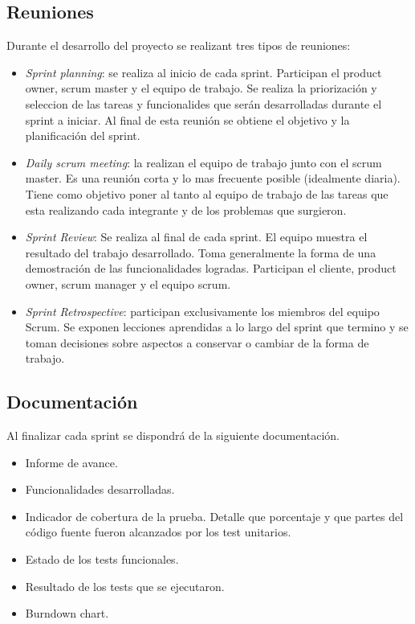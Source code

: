 \documentclass[12pt,a4paper]{article}
\begin{document}
	\subsection{Reuniones}
	Durante el desarrollo del proyecto se realizant tres tipos de reuniones:

	\begin{itemize}
	\item \textit{Sprint planning}: se realiza al inicio de cada sprint. Participan el product owner, scrum master y el equipo de trabajo. Se realiza la priorización y seleccion de las tareas y funcionalides que serán desarrolladas durante el sprint a iniciar. Al final de esta reunión se obtiene el objetivo y la planificación del sprint.

	\item \textit{Daily scrum meeting}: la realizan el equipo de trabajo junto con el scrum master. Es una reunión corta y lo mas frecuente posible (idealmente diaria).  Tiene como objetivo poner al tanto al equipo de trabajo de las tareas que esta realizando cada integrante y de los problemas que surgieron.

	\item \textit{Sprint Review}: Se realiza al final de cada sprint. El equipo muestra el resultado del trabajo desarrollado. Toma generalmente la forma de una demostración de las funcionalidades logradas. Participan el cliente, product owner, scrum manager y el equipo scrum.

	\item \textit{Sprint Retrospective}: participan exclusivamente los miembros del equipo Scrum. Se exponen lecciones aprendidas a lo largo del sprint que termino y se toman decisiones sobre aspectos a conservar o cambiar de la forma de trabajo.
	\end{itemize}


	\subsection{Documentación}
	Al finalizar cada sprint se dispondrá de la siguiente documentación.

	\begin{itemize}
		\item Informe de avance.
		\item Funcionalidades desarrolladas.
		\item Indicador de cobertura de la prueba. Detalle que porcentaje y que partes del código fuente fueron alcanzados por los test unitarios.
		\item Estado de los tests funcionales.
		\item Resultado de los tests que se ejecutaron.
		\item Burndown chart.
	\end{itemize}
\end{document}
